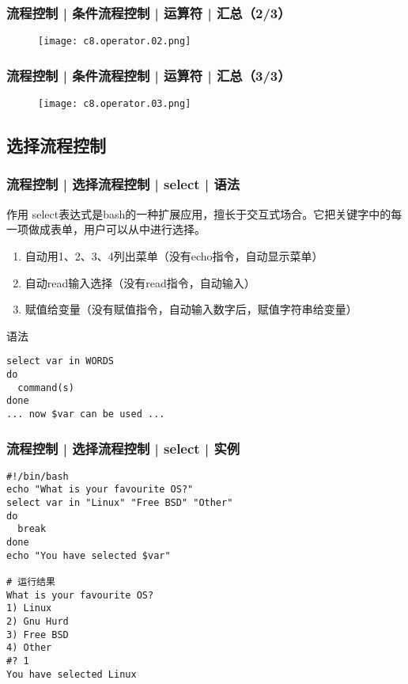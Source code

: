 \begin{frame}
  \frametitle{流程控制 | 条件流程控制 | 运算符 | 汇总（2/3）}
  \begin{figure}
    \centering
    \texttt{[image: c8.operator.02.png]}
  \end{figure}
\end{frame}

\begin{frame}
  \frametitle{流程控制 | 条件流程控制 | 运算符 | 汇总（3/3）}
  \begin{figure}
    \centering
    \texttt{[image: c8.operator.03.png]}
  \end{figure}
\end{frame}

\subsection{选择流程控制}
\begin{frame}[fragile]
  \frametitle{流程控制 | 选择流程控制 | select | \alert{语法}}
  \begin{block}{作用}
    select表达式是bash的一种扩展应用，擅长于交互式场合。它把关键字中的每一项做成表单，用户可以从中进行选择。
    \begin{enumerate}
      \item 自动用1、2、3、4列出菜单（没有echo指令，自动显示菜单）
      \item 自动read输入选择（没有read指令，自动输入）
      \item 赋值给变量（没有赋值指令，自动输入数字后，赋值字符串给变量）
    \end{enumerate}
  \end{block}
  \pause
  \begin{block}{语法}
\begin{lstlisting}
select var in WORDS
do
  command(s)
done
... now $var can be used ...
\end{lstlisting}
  \end{block}
\end{frame}

\begin{frame}[fragile]
  \frametitle{流程控制 | 选择流程控制 | select | \alert{实例}}
\begin{lstlisting}
#!/bin/bash
echo "What is your favourite OS?"
select var in "Linux" "Free BSD" "Other"
do
  break
done
echo "You have selected $var"

# 运行结果
What is your favourite OS?
1) Linux
2) Gnu Hurd
3) Free BSD
4) Other
#? 1
You have selected Linux
\end{lstlisting}
\end{frame}

